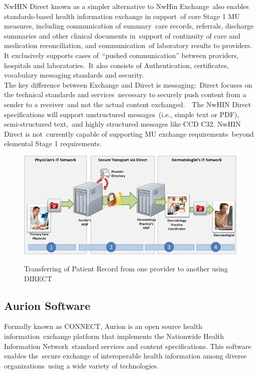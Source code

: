  	NwHIN Direct known as a simpler alternative to NwHin Exchange\
also enables standards-based health information exchange in support\
 of core Stage 1 MU measures, including communication of summary\
care records, referrals, discharge summaries and other clinical documents in\
 support of continuity of care and medication reconciliation, and communication\
 of laboratory results to providers. It exclusively supports cases of\
 “pushed communication” between providers, hospitals and laboratories.\
 It also consists of Authentication, certificates, vocabulary messaging standards and security.\\

The key difference between Exchange and Direct is messaging:\
Direct focuses on the technical standards and services\
necessary to securely push content from a sender to a receiver\
 and not the actual content exchanged.\
\citep{_nwhin_direct_2013}\ 
The NwHIN Direct specifications will support unstructured messages\ 
(i.e., simple text or PDF), semi-structured text,\
 and highly structured messages  like CCD C32. NwHIN Direct is not\
currently capable of supporting MU exchange requirements\
beyond elemental Stage 1 requirements.\
\citep{_nwhin_exchange_2013}\

 \begin{figure}[ht!]
    \centering
    \includegraphics[scale=0.5]{nwhin.png}
    \caption{Transferring of Patient Record from one provider to another using DIRECT}
    \cite[Fig.~1]{_nwhin_frameworkOne_2013}
    \label{fig:nwhin}
  \end{figure}  

  \subsection{Aurion Software}

	Formally known as CONNECT, Aurion is an open source health information\
exchange platform that implements the Nationwide Health Information Network\
 standard services and content specifications. This software enables the\
secure exchange of interoperable health information among diverse organizations\
 using a wide variety of technologies.\\

